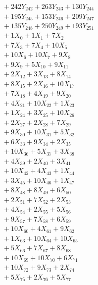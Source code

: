 \documentclass[a4paper,10pt]{article}
\begin{document}
{\begin{align}
&\;  + 242 Y_{242} + 263 Y_{243} + 130 Y_{244} \\[0.3ex]
&\;  + 195 Y_{245} + 153 Y_{246} + 209 Y_{247} \\[0.3ex]
&\;  + 135 Y_{248} + 250 Y_{249} + 193 Y_{251} \\[0.3ex]
&\;  + 1 X_{0} + 1 X_{1} + 7 X_{2} \\[0.3ex]
&\;  + 7 X_{3} + 7 X_{4} + 10 X_{5} \\[0.3ex]
&\;  + 10 X_{6} + 10 X_{7} + 9 X_{8} \\[0.3ex]
&\;  + 9 X_{9} + 5 X_{10} + 9 X_{11} \\[0.3ex]
&\;  + 2 X_{12} + 3 X_{13} + 8 X_{14} \\[0.3ex]
&\;  + 8 X_{15} + 2 X_{16} + 10 X_{17} \\[0.5ex]\allowbreak
&\;  + 7 X_{18} + 4 X_{19} + 9 X_{20} \\[0.3ex]
&\;  + 4 X_{21} + 10 X_{22} + 1 X_{23} \\[0.3ex]
&\;  + 1 X_{24} + 3 X_{25} + 10 X_{26} \\[0.3ex]
&\;  + 2 X_{27} + 2 X_{28} + 7 X_{29} \\[0.3ex]
&\;  + 9 X_{30} + 10 X_{31} + 5 X_{32} \\[0.3ex]
&\;  + 6 X_{33} + 9 X_{34} + 2 X_{35} \\[0.3ex]
&\;  + 10 X_{36} + 5 X_{37} + 3 X_{38} \\[0.3ex]
&\;  + 4 X_{39} + 2 X_{40} + 3 X_{41} \\[0.3ex]
&\;  + 10 X_{42} + 4 X_{43} + 1 X_{44} \\[0.3ex]
&\;  + 3 X_{45} + 10 X_{46} + 1 X_{47} \\[0.5ex]\allowbreak
&\;  + 8 X_{48} + 8 X_{49} + 6 X_{50} \\[0.3ex]
&\;  + 2 X_{51} + 7 X_{52} + 2 X_{53} \\[0.3ex]
&\;  + 4 X_{54} + 2 X_{55} + 5 X_{56} \\[0.3ex]
&\;  + 9 X_{57} + 7 X_{58} + 6 X_{59} \\[0.3ex]
&\;  + 10 X_{60} + 4 X_{61} + 9 X_{62} \\[0.3ex]
&\;  + 1 X_{63} + 10 X_{64} + 10 X_{65} \\[0.3ex]
&\;  + 5 X_{66} + 7 X_{67} + 8 X_{68} \\[0.3ex]
&\;  + 10 X_{69} + 10 X_{70} + 6 X_{71} \\[0.3ex]
&\;  + 10 X_{72} + 9 X_{73} + 2 X_{74} \\[0.3ex]
&\;  + 5 X_{75} + 2 X_{76} + 5 X_{77} \\[0.5ex]\allowbreak

\end{align}}
\end{document}

